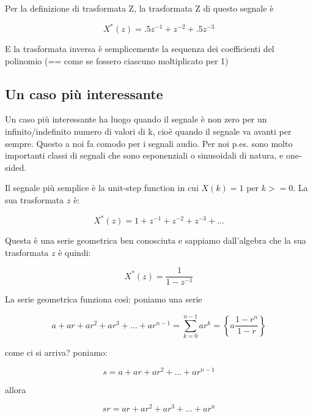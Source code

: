      Per la definizione di trasformata Z, la trasformata Z di questo segnale \`e

		 \begin{equation}
	   	 X^{*}(z) = .5z^{-1} + z^{-2} + .5z^{-3}
		 \end{equation}

     E la trasformata inversa \`e semplicemente la sequenza dei coefficienti del
     polinomio (== come se fossero ciascuno moltiplicato per 1)

\subsection{Un caso pi\`u interessante}

Un caso pi\`u interessante ha luogo quando il segnale \`e non  zero  per
    un infinito/indefinito numero  di  valori  di  k,  cio\`e  quando  il
    segnale va avanti per sempre. Questo a noi fa comodo per i segnali audio.
    Per noi p.es. sono molto importanti classi di segnali che sono
    esponenziali o sinusoidali di natura, e one-sided.

    Il segnale pi\`u semplice \`e la unit-step function in cui $X(k) = 1$ per $k >= 0$.
		La sua trasformata $z$ \`e:

		 \begin{equation}
						 X^{*}(z) = 1 + z^{-1} + z^{-2} + z^{-3} + \ldots
		 \end{equation}

    Questa \`e una serie geometrica ben conosciuta e sappiamo dall'algebra che
    la sua trasformata $z$ \`e quindi:

		 \begin{equation}
			 X^{*}(z) = \frac{1}{1-z^{-1}}
		 \end{equation}

   La serie geometrica funziona cos\`i: poniamo una serie

		 \begin{equation}
			a + ar + ar^{2} + ar^{3} + ... + ar^{n-1} = \sum_{k=0}^{n-1}{ar^{k}} =  \left\{ a\frac{1-r^{n}}{1 - r} \right\}
		 \end{equation}

   come ci si arriva? poniamo:

		 \begin{equation}
    s = a + ar + ar^{2} + \ldots + ar^{n-1}
		 \end{equation}

   allora 

		 \begin{equation}
    sr = ar + ar^{2} + ar^{3} + ... + ar^{n}
		 \end{equation}

